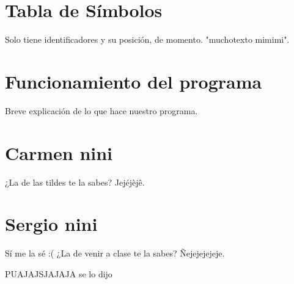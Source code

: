 \documentclass{article}
\begin{document}
\section{Tabla de Símbolos}
Solo tiene identificadores y su posición, de momento. "muchotexto mimimi".

\section{Funcionamiento del programa}
Breve explicación de lo que hace nuestro programa.

\section{Carmen nini}
¿La de las tildes te la sabes? Jejéjèjê.

\section{Sergio nini}
Sí me la sé :( ¿La de venir a clase te la sabes? Ñejejejejeje.

PUAJAJSJAJAJA se lo dijo
\end{document}
